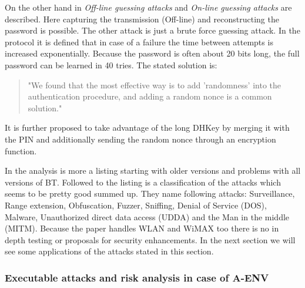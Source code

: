 \documentclass[12pt,a4paper]{article}
\begin{document}
On the other hand in \cite{DBLP:conf/apnoms/FanSL11} \emph{Off-line guessing attacks} and \emph{On-line guessing attacks} are described. Here capturing the transmission (Off-line) and reconstructing the password is possible. The other attack is just a brute force guessing attack. In the protocol it is defined that in case of a failure the time between attempts is increased exponentially. Because the password is often about 20 bits long, the full password can be learned in 40 tries. The stated solution is:
\begin{quote}
"We found that the most effective way is to add 'randomness' into the authentication procedure, and adding a random nonce is a common solution."\cite{DBLP:conf/apnoms/FanSL11}
\end{quote}
It is further proposed to take advantage of the long DHKey by merging it with the PIN and additionally sending the random nonce through an encryption function.

In \cite{DBLP:journals/ijnsec/Lackner13} the analysis is more a listing starting with older versions and problems with all versions of BT. Followed to the listing is a classification of the attacks which seems to be pretty good summed up. They name following attacks: Surveillance, Range extension, Obfuscation, Fuzzer, Sniffing, Denial of Service (DOS), Malware, Unauthorized direct data access (UDDA) and the Man in the middle (MITM). Because the paper handles WLAN and WiMAX too there is no in depth testing or proposals for security enhancements. In the next section we will see some applications of the attacks stated in this section.

\subsubsection{Executable attacks and risk analysis in case of A-ENV}
\end{document}
